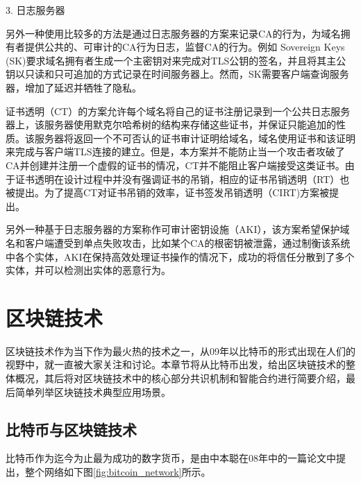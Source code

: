 3. 日志服务器

另外一种使用比较多的方法是通过日志服务器的方案来记录CA的行为，为域名拥有者提供公共的、可审计的CA行为日志，监督CA的行为。例如 Sovereign Keys (SK)\cite{eckersley2012internet}要求域名拥有者生成一个主密钥对来完成对TLS公钥的签名，并且将其主公钥以只读和只可追加的方式记录在时间服务器上。然而，SK需要客户端查询服务器，增加了延迟并牺牲了隐私。

证书透明（CT）\cite{laurie2013certificate}的方案允许每个域名将自己的证书注册记录到一个公共日志服务器上，该服务器使用默克尔哈希树的结构来存储这些证书，并保证只能追加的性质。该服务器将返回一个不可否认的证书审计证明给域名，域名使用证书和该证明来完成与客户端TLS连接的建立。但是，本方案并不能防止当一个攻击者攻破了CA并创建并注册一个虚假的证书的情况，CT并不能阻止客户端接受这类证书。由于证书透明在设计过程中并没有强调证书的吊销，相应的证书吊销透明（RT）\cite{laurie2012revocation}也被提出。为了提高CT对证书吊销的效率，证书签发吊销透明（CIRT)\cite{ryan2014enhanced}方案被提出。

另外一种基于日志服务器的方案称作可审计密钥设施（AKI）\cite{kim2013accountable}，该方案希望保护域名和客户端遭受到单点失败攻击，比如某个CA的根密钥被泄露，通过制衡该系统中各个实体，AKI在保持高效处理证书操作的情况下，成功的将信任分散到了多个实体，并可以检测出实体的恶意行为。






\section{区块链技术}




区块链技术作为当下作为最火热的技术之一，从09年以比特币的形式出现在人们的视野中，就一直被大家关注和讨论。本章节将从比特币出发，给出区块链技术的整体概况，其后将对区块链技术中的核心部分共识机制和智能合约进行简要介绍，最后简单列举区块链技术典型应用场景。

\subsection{比特币与区块链技术}


比特币作为迄今为止最为成功的数字货币，是由中本聪在08年中的一篇论文中提出\cite{nakamoto2008bitcoin}，整个网络如下图\ref{fig:bitcoin_network}所示。

